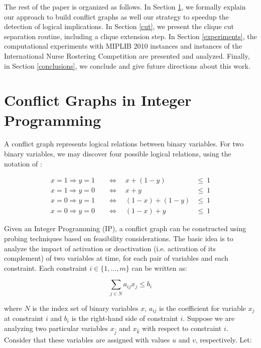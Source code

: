 \documentclass{endm}
\begin{document}
The rest of the paper is organized as follows. In Section \ref{seccgraph}, we formally explain our approach to build conflict graphs as well our strategy to speedup the detection of logical implications. In Section \ref{cut}, we present the clique cut separation routine, including a clique extension step. In Section \ref{experiments}, the computational experiments with MIPLIB 2010 instances \cite{miplib} and instances of the International Nurse Rostering Competition \cite{haspeslagh} are presented and analyzed. Finally, in Section \ref{conclusions}, we conclude and give future directions about this work.

\section{Conflict Graphs in Integer Programming}\label{seccgraph}

A conflict graph represents logical relations between binary variables. For two binary variables, we may discover four possible logical relations, using the notation of \cite{atamturk}:

\begin{align}
x = 1 \Rightarrow y = 1 & \quad \Longleftrightarrow \quad x + (1 - y) & \leq \ 1\\
x = 1 \Rightarrow y = 0 & \quad \Longleftrightarrow \quad x + y & \leq \ 1 \\
x = 0 \Rightarrow y = 1 & \quad \Longleftrightarrow \quad (1 - x) + (1 - y) & \leq \ 1 \\
x = 0 \Rightarrow y = 0 & \quad \Longleftrightarrow \quad (1 - x) + y & \leq \ 1
\end{align}

Given an Integer Programming (IP), a conflict graph can be constructed using probing techniques based on feasibility considerations. The basic idea is to analyze the impact of activation or deactivation (i.e. activation of its complement) of two variables at time, for each pair of variables and each constraint. Each constraint $i \in \{1,\ldots,m\}$ can be written as:

\begin{equation}
 \sum_{j \in N} a_{ij}x_{j} \leq b_{i} 
\end{equation}

\noindent where $N$ is the index set of binary variables $x$, $a_{ij}$ is the coefficient for variable $x_{j}$ at constraint $i$ and $b_{i}$ is the right-hand side of constraint $i$. Suppose we are analyzing two particular variables $x_{\hat{j}}$ and $x_{\hat{k}}$ with respect to constraint $i$. Consider that these variables are assigned with values $u$ and $v$, respectively. Let:
\end{document}
